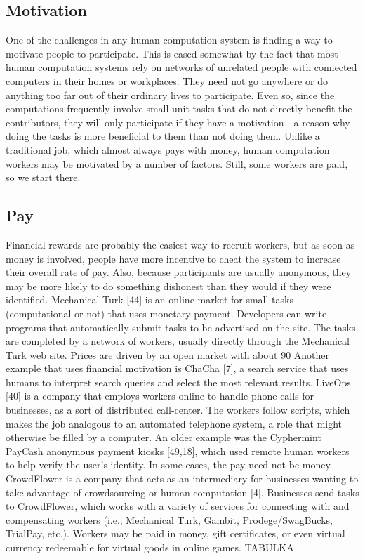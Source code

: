 \documentclass{sig-alternate}
\begin{document}
\subsection*{Motivation}
One of the challenges in any human computation system is finding a way to motivate people to participate. This is eased somewhat by the fact that most human computation systems rely on networks of unrelated people with connected computers in their homes or workplaces. They need not go anywhere or do anything too far out of their ordinary lives to participate. Even so, since the computations frequently involve small unit tasks that do not directly benefit the contributors, they will only participate if they have a motivation—a reason why doing the tasks is more beneficial to them than not doing them. Unlike a traditional job, which almost always pays with money, human computation workers may be motivated by a number of factors. Still, some workers are paid, so we start there.
\subsection*{Pay}
Financial rewards are probably the easiest way to recruit workers, but as soon as money is involved, people have more incentive to cheat the system to increase their overall rate of pay. Also, because participants are usually anonymous, they may be more likely to do something dishonest than they would if they were identified.
Mechanical Turk [44] is an online market for small tasks (computational or not) that uses monetary payment. Developers can write programs that automatically submit tasks to be advertised on the site. The tasks are completed by a network of workers, usually directly through the Mechanical Turk web site. Prices are driven by an open market with about 90%
Another example that uses financial motivation is ChaCha [7], a search service that uses humans to interpret search queries and select the most relevant results. LiveOps [40] is a company that employs workers online to handle phone calls for businesses, as a sort of distributed call-center. The workers follow scripts, which makes the job analogous to an automated telephone system, a role that might otherwise be filled by a computer. An older example was the Cyphermint PayCash anonymous payment kiosks [49,18], which used remote human workers to help verify the user's identity.
In some cases, the pay need not be money. CrowdFlower is a company that acts as an intermediary for businesses wanting to take advantage of crowdsourcing or human computation [4]. Businesses send tasks to CrowdFlower, which works with a variety of services for connecting with and compensating workers (i.e., Mechanical Turk, Gambit, Prodege/SwagBucks, TrialPay, etc.). Workers may be paid in money, gift certificates, or even virtual currency redeemable for virtual goods in online games.
TABULKA
\end{document}
